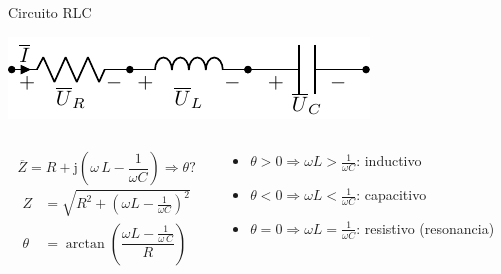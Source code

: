 \documentclass[aspectratio=169, xcolor={usenames,svgnames,dvipsnames}]{beamer}
\begin{document}
\begin{frame}{Circuito RLC}
\begin{center}
\includegraphics[height=0.2\textheight]{../figs/RLC.pdf}
\end{center}

\begin{columns}
\begin{column}{0.45\columnwidth}
\[
\overline{Z} = R+ \mathrm{j}\left(\omega\,L-\dfrac{1}{\omega C}\right) \Rightarrow \boxed{\theta?}
\]
\begin{align*}
    Z &= \sqrt{R^2+\left(\omega L -\frac{1}{\omega C} \right)^2}\\
    \theta&=\arctan\left(\dfrac{\omega L-\frac{1}{\omega\,C}}{R} \right)
\end{align*}
\end{column}

\begin{column}{0.55\columnwidth}
\begin{itemize}
\item \(\theta > 0 \Rightarrow \omega L > \frac{1}{\omega C}\): inductivo
\item \(\theta < 0 \Rightarrow \omega L < \frac{1}{\omega C}\): capacitivo
\item \(\theta = 0 \Rightarrow \omega L = \frac{1}{\omega C}\): resistivo (resonancia)
\end{itemize}
\end{column}
\end{columns}
\end{frame}
\end{document}
